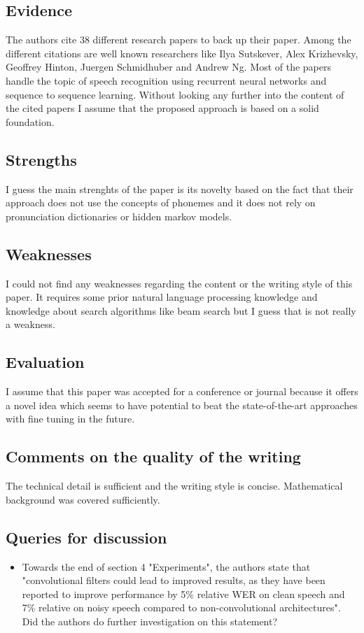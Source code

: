 \documentclass[a4paper]{article}
\begin{document}
\subsection{Evidence}

The authors cite 38 different research papers to back up their paper. Among the different citations are well known researchers like Ilya Sutskever, Alex Krizhevsky, Geoffrey Hinton, Juergen Schmidhuber and Andrew Ng. Most of the papers handle the topic of speech recognition using recurrent neural networks and sequence to sequence learning. Without looking any further into the content of the cited papers I assume that the proposed approach is based on a solid foundation.

\subsection{Strengths}

I guess the main strenghts of the paper is its novelty based on the fact that their approach does not use the concepts of phonemes and it does not rely on pronunciation dictionaries or hidden markov models.

\subsection{Weaknesses}

I could not find any weaknesses regarding the content or the writing style of this paper. It requires some prior natural language processing knowledge and knowledge about search algorithms like beam search but I guess that is not really a weakness.

\subsection{Evaluation}

I assume that this paper was accepted for a conference or journal because it offers a novel idea which seems to have potential to beat the state-of-the-art approaches with fine tuning in the future.

\subsection{Comments on the quality of the writing}

The technical detail is sufficient and the writing style is concise. Mathematical background was covered sufficiently.

\subsection{Queries for discussion}

\begin{itemize}
	\item Towards the end of section 4 "Experiments", the authors state that "convolutional filters could lead to improved results, as they have been reported to improve performance by 5\% relative WER on clean speech and 7\% relative on noisy speech compared to non-convolutional architectures". Did the authors do further investigation on this statement?
\end{itemize}
\end{document}
